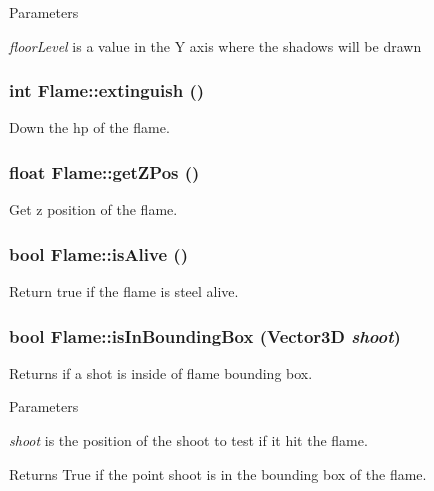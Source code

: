 \begin{DoxyParams}{Parameters}
\item[{\em floorLevel}]is a value in the Y axis where the shadows will be drawn \end{DoxyParams}
\hypertarget{classFlame_a680de652b1c92eb697a8c0c21720dadd}{
\subsubsection[{extinguish}]{\setlength{\rightskip}{0pt plus 5cm}int Flame::extinguish ()}}
\label{classFlame_a680de652b1c92eb697a8c0c21720dadd}
Down the hp of the flame. \hypertarget{classFlame_ae3bafab240d4ea382dc22a971f8b78b2}{
\subsubsection[{getZPos}]{\setlength{\rightskip}{0pt plus 5cm}float Flame::getZPos ()}}
\label{classFlame_ae3bafab240d4ea382dc22a971f8b78b2}
Get z position of the flame. \hypertarget{classFlame_ab640c722a62376f6f4c323e6dbb704ae}{
\subsubsection[{isAlive}]{\setlength{\rightskip}{0pt plus 5cm}bool Flame::isAlive ()}}
\label{classFlame_ab640c722a62376f6f4c323e6dbb704ae}
Return true if the flame is steel alive. \hypertarget{classFlame_a65be7ac4fe325708cc247d53648e30e9}{
\subsubsection[{isInBoundingBox}]{\setlength{\rightskip}{0pt plus 5cm}bool Flame::isInBoundingBox ({\bf Vector3D} {\em shoot})}}
\label{classFlame_a65be7ac4fe325708cc247d53648e30e9}
Returns if a shot is inside of flame bounding box.


\begin{DoxyParams}{Parameters}
\item[{\em shoot}]is the position of the shoot to test if it hit the flame.\end{DoxyParams}
\begin{DoxyReturn}{Returns}
True if the point shoot is in the bounding box of the flame. 
\end{DoxyReturn}


